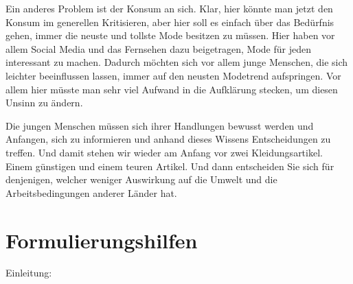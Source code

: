 Ein anderes Problem ist der Konsum an sich. Klar, hier könnte man jetzt den Konsum im generellen Kritisieren, aber hier soll es einfach über das Bedürfnis gehen, immer die neuste und tollste Mode besitzen zu müssen. Hier haben vor allem Social Media und das Fernsehen dazu beigetragen, Mode für jeden interessant zu machen. Dadurch möchten sich vor allem junge Menschen, die sich leichter beeinflussen lassen, immer auf den neusten Modetrend aufspringen. Vor allem hier müsste man sehr viel Aufwand in die Aufklärung stecken, um diesen Unsinn zu ändern.  

Die jungen Menschen müssen sich ihrer Handlungen bewusst werden und Anfangen, sich zu informieren und anhand dieses Wissens Entscheidungen zu treffen. Und damit stehen wir wieder am Anfang vor zwei Kleidungsartikel. Einem günstigen und einem teuren Artikel. Und dann entscheiden Sie sich für denjenigen, welcher weniger Auswirkung auf die Umwelt und die Arbeitsbedingungen anderer Länder hat. 

\section{Formulierungshilfen}
Einleitung:

